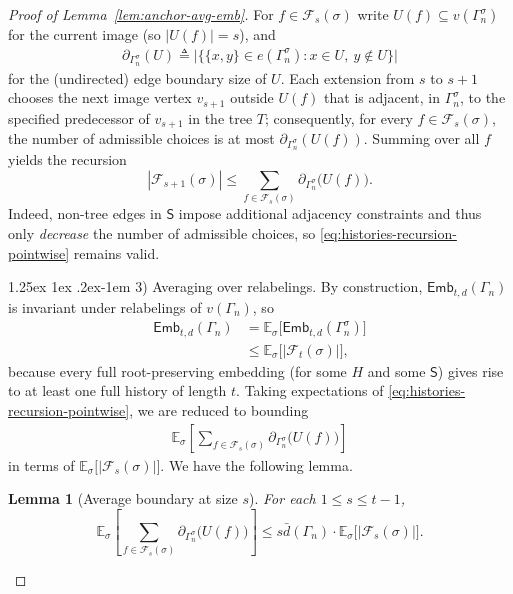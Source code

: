 \documentclass[12pt]{article}
\makeatletter
\newtheorem{lemma}{Lemma}
\newcommand{\s}[1]{\mathsf{#1}}
\renewcommand{\paragraph}{%
  \@startsection{paragraph}{4}%
  {\z@}{1.25ex \@plus 1ex \@minus .2ex}{-1em}%
  {\normalfont\normalsize\bfseries}%
}
\makeatother
\begin{document}
\begin{proof}[Proof of Lemma~\ref{lem:anchor-avg-emb}]
For $f\in\mathcal F_s(\sigma)$ write $U(f)\subseteq v(\Gamma_n^\sigma)$ for the current image (so $|U(f)|=s$), and
\begin{align}
\partial_{\Gamma_n^\sigma}(U)\triangleq\big|\{  \{x,y\}\in e(\Gamma_n^\sigma): x\in U,\ y\notin U  \}\big|
\end{align}
for the (undirected) edge boundary size of $U$.
Each extension from $s$ to $s+1$ chooses the next image vertex $v_{s+1}$ outside $U(f)$ that is adjacent, in $\Gamma_n^\sigma$, to the specified predecessor of $v_{s+1}$ in the tree $T$; consequently, for every $f\in\mathcal F_s(\sigma)$,
the number of admissible choices is at most $\partial_{\Gamma_n^\sigma}(U(f))$.
Summing over all $f$ yields the recursion
\begin{equation}\label{eq:histories-recursion-pointwise}
|\mathcal F_{s+1}(\sigma)|
\leq \sum_{f\in\mathcal F_s(\sigma)} \partial_{\Gamma_n^\sigma}\big(U(f)\big).
\end{equation}
Indeed, non-tree edges in $\mathsf S$ impose additional adjacency constraints and thus only \emph{decrease} the number of admissible choices, so \eqref{eq:histories-recursion-pointwise} remains valid.

\paragraph{3) Averaging over relabelings.}
By construction, $\s{Emb}_{t,d}(\Gamma_n)$ is invariant under relabelings of $v(\Gamma_n)$, so
\begin{align}
\s{Emb}_{t,d}(\Gamma_n)&=\mathbb E_\sigma\big[\s{Emb}_{t,d}(\Gamma_n^\sigma)\big]\\
&\leq \mathbb E_\sigma\big[  |\mathcal F_t(\sigma)|  \big],
\end{align}
because every full root-preserving embedding (for some $H$ and some $\mathsf S$) gives rise to at least one full history of length $t$.
Taking expectations of \eqref{eq:histories-recursion-pointwise}, we are reduced to bounding
\begin{align}
\mathbb E_\sigma\left[\sum_{f\in\mathcal F_s(\sigma)} \partial_{\Gamma_n^\sigma}\big(U(f)\big)\right]
\end{align}
in terms of $\mathbb E_\sigma\big[  |\mathcal F_s(\sigma)|  \big]$. We have the following lemma.

\begin{lemma}[Average boundary at size $s$]\label{cl:avg-boundary}
For each $1\le s\le t-1$,
\begin{equation}\label{eq:avg-boundary}
\mathbb E_\sigma\left[\sum_{f\in\mathcal F_s(\sigma)} \partial_{\Gamma_n^\sigma}\big(U(f)\big)\right]
\leq 
s  \bar{d}(\Gamma_n)\cdot \mathbb E_\sigma\big[  |\mathcal F_s(\sigma)|  \big].
\end{equation}
\end{lemma}


\end{proof}
\end{document}
